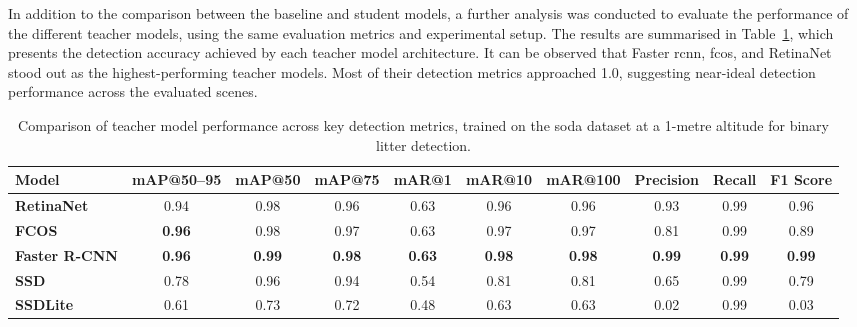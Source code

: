 In addition to the comparison between the baseline and student models, a further analysis was conducted to evaluate the performance of the different teacher models, using the same evaluation metrics and experimental setup. The results are summarised in Table~\ref{tab:teacher_model_metrics_soda01m}, which presents the detection accuracy achieved by each teacher model architecture. It can be observed that Faster \gls{rcnn}, \gls{fcos}, and RetinaNet stood out as the highest-performing teacher models. Most of their detection metrics approached 1.0, suggesting near-ideal detection performance across the evaluated scenes. 

\begin{table}[!ht]
    \centering
    \begin{adjustbox}{max width=\textwidth}
    \renewcommand{\arraystretch}{1.5}
    \begin{tabular}{|l|c|c|c|c|c|c|c|c|c|}
        \hline%
        \textbf{Model} & \textbf{mAP@50--95} & \textbf{mAP@50} & \textbf{mAP@75} & \textbf{mAR@1} & \textbf{mAR@10} & \textbf{mAR@100} & \textbf{Precision} & \textbf{Recall} & \textbf{F1 Score} \\ \hline \hline
        \textbf{RetinaNet} & 0.94 & 0.98 & 0.96 & 0.63 & 0.96 & 0.96 & 0.93 & 0.99 & 0.96 \\\hline
        \textbf{FCOS} & \textbf{0.96} & 0.98 & 0.97 & 0.63 & 0.97 & 0.97 & 0.81 & 0.99 & 0.89 \\\hline
        \textbf{Faster R-CNN} & \textbf{0.96} & \textbf{0.99} & \textbf{0.98} & \textbf{0.63} & \textbf{0.98} & \textbf{0.98} & \textbf{0.99} & \textbf{0.99} & \textbf{0.99} \\\hline
        \textbf{SSD} & 0.78 & 0.96 & 0.94 & 0.54 & 0.81 & 0.81 & 0.65 & 0.99 & 0.79 \\\hline
        \textbf{SSDLite} & 0.61 & 0.73 & 0.72 & 0.48 & 0.63 & 0.63 & 0.02 & 0.99 & 0.03 \\
        \hline%
    \end{tabular}
    \renewcommand{\arraystretch}{1}
    \end{adjustbox}
    \caption{Comparison of teacher model performance across key detection metrics, trained on the \gls{soda} dataset at a 1-metre altitude for binary litter detection.}
    \label{tab:teacher_model_metrics_soda01m}
\end{table}

